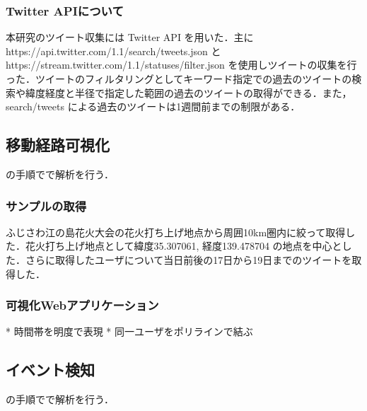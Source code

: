 \subsubsection{Twitter APIについて}
本研究のツイート収集には Twitter API を用いた．主に https://api.twitter.com/1.1/search/tweets.json と https://stream.twitter.com/1.1/statuses/filter.json を使用しツイートの収集を行った．ツイートのフィルタリングとしてキーワード指定での過去のツイートの検索や緯度経度と半径で指定した範囲の過去のツイートの取得ができる．また，search/tweets による過去のツイートは1週間前までの制限がある．

\subsection{移動経路可視化}
の手順でで解析を行う．

\subsubsection{サンプルの取得}
ふじさわ江の島花火大会の花火打ち上げ地点から周囲10km圏内に絞って取得した．花火打ち上げ地点として緯度35.307061, 経度139.478704 の地点を中心とした．さらに取得したユーザについて当日前後の17日から19日までのツイートを取得した．


\subsubsection{可視化Webアプリケーション}
* 時間帯を明度で表現
* 同一ユーザをポリラインで結ぶ

\subsection{イベント検知}
の手順でで解析を行う．

